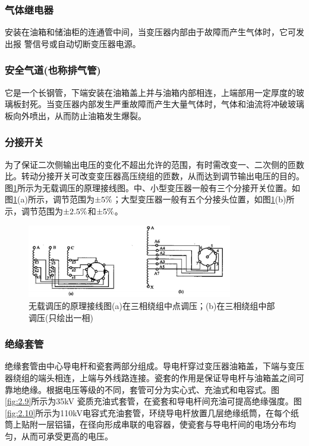 \documentclass{book}
\begin{document}
\subsubsection{气体继电器}

安装在油箱和储油柜的连通管中间，当变压器内部由于故障而产生气体时，它可发出报 警信号或自动切断变压器电源。

\subsubsection{安全气道(也称排气管)}

它是一个长钢管，下端安装在油箱盖上并与油箱内部相连，上端部用一定厚度的玻璃板封死。当变压器内部发生严重故障而产生大量气体时，气体和油流将冲破玻璃板向外喷出，从而防止油箱发生爆裂。

\subsubsection{分接开关}

为了保证二次侧输出电压的变化不超出允许的范围，有时需改变一、二次侧的匝数比。转动分接开关可改变变压器高压绕组的匝数，从而达到调节输出电压的目的。图\ref{fig_2.8}所示为无载调压的原理接线图。中、小型变压器一般有三个分接开关位置。如图\ref{fig_2.8}(a)所示，调节范围为$ \pm 5{\rm{\% }}$；大型变压器一般有五个分接头位置，如图\ref{fig_2.8}(b)所示，调节范围为$ \pm 2.5{\rm{\% }}$和$ \pm 5{\rm{\% }}$。
\begin{figure}[H]
	\centering
	\includegraphics[width=0.80\textwidth]{2-8.png}
	\caption{无载调压的原理接线图(a)在三相绕组中点调压；(b)在三相绕组中部调压(只绘出一相)}
	\label{fig_2.8}
\end{figure}
\subsubsection{绝缘套管}

绝缘套管由中心导电杆和瓷套两部分组成。导电杆穿过变压器油箱盖，下端与变压器绕组的端头相连，上端与外线路连接。瓷套的作用是保证导电杆与油箱盖之间可靠地绝缘。根据电压等级的不同，套管可分为实心式、充油式和电容式。图\ref{fig:2.9}所示为35kV 瓷质充油式套管，在瓷套和导电杆间充油可提高绝缘强度。图\ref{fig:2.10}所示为110kV电容式充油套管，环绕导电杆放置几层绝缘纸筒，在每个纸筒上贴附一层铝锚，在径向形成串联的电容器，使瓷套与导电杆间的电场分布均匀，从而可承受更高的电压。
\end{document}

